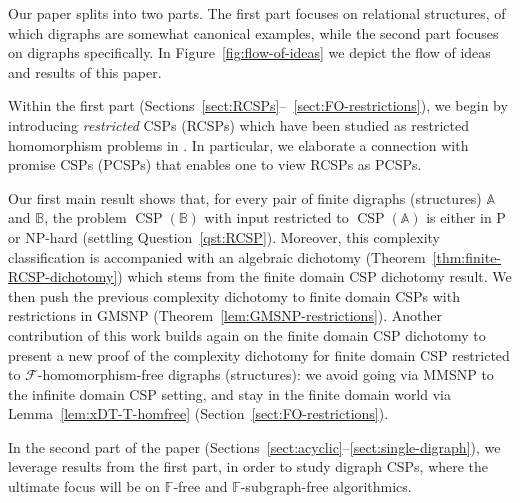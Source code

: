 \documentclass{article}
\theoremstyle{definition}
\theoremstyle{remark}
\DeclareMathOperator{\CSP}{CSP}
\newcommand{\bA}{{\mathbb A}}
\newcommand{\bB}{{\mathbb B}}
\newcommand{\bF}{{\mathbb F}}
\newcommand{\calF}{{\mathcal F}}
\begin{document}
Our paper splits into two parts. The first part focuses on relational structures,
of which digraphs are somewhat canonical examples, while the second part focuses
on digraphs specifically. In Figure~\ref{fig:flow-of-ideas} we depict the 
flow of ideas and results of this paper.

Within the first part (Sections~\ref{sect:RCSPs}--~\ref{sect:FO-restrictions}),
we begin by introducing \emph{restricted} CSPs (RCSPs)
which have been studied as restricted homomorphism problems in \cite{BHM97,brewsterDAM156}.
In particular, we elaborate a connection with promise CSPs (PCSPs) that enables
one to view RCSPs as PCSPs. 

Our first main result shows that, for every pair of finite digraphs (structures)
$\bA$ and $\bB$, the problem $\CSP(\bB)$ with input restricted to $\CSP(\bA)$ is either
in P or NP-hard (settling Question~\ref{qst:RCSP}). Moreover, this complexity
classification is accompanied with an algebraic dichotomy
(Theorem~\ref{thm:finite-RCSP-dichotomy}) which stems from the finite domain
CSP dichotomy result. We then push the previous complexity dichotomy to finite domain CSPs
with restrictions in GMSNP (Theorem~\ref{lem:GMSNP-restrictions}). Another contribution of
this work builds again on the finite domain CSP dichotomy to present a new proof of the
complexity dichotomy for  finite domain CSP restricted to $\calF$-homomorphism-free digraphs
(structures): we avoid going via MMSNP to the infinite domain CSP setting, and stay in the 
finite domain world via Lemma~\ref{lem:xDT-T-homfree} (Section~\ref{sect:FO-restrictions}).


In the second part of the paper (Sections~\ref{sect:acyclic}--\ref{sect:single-digraph}),
we leverage results from the first part, in order to study digraph CSPs, where the ultimate
focus will be on $\bF$-free and $\bF$-subgraph-free algorithmics.
\end{document}

